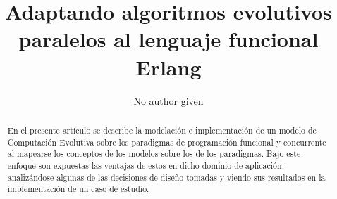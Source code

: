 \documentclass[runningheads]{llncs}
\begin{document}
\mainmatter  %

\title{Adaptando algoritmos evolutivos paralelos al lenguaje funcional Erlang}

\author{No author given}

%



\maketitle
\begin{abstract}
En el presente artículo se describe la modelación e implementación de un modelo de Computación Evolutiva sobre los paradigmas de programación funcional y concurrente al mapearse los conceptos de los modelos sobre los de los paradigmas. Bajo este enfoque son expuestas las ventajas de estos en dicho dominio de aplicación, analizándose algunas de las decisiones de diseño tomadas y viendo sus resultados en la implementación de un caso de estudio.
\end{abstract}
\end{document}
